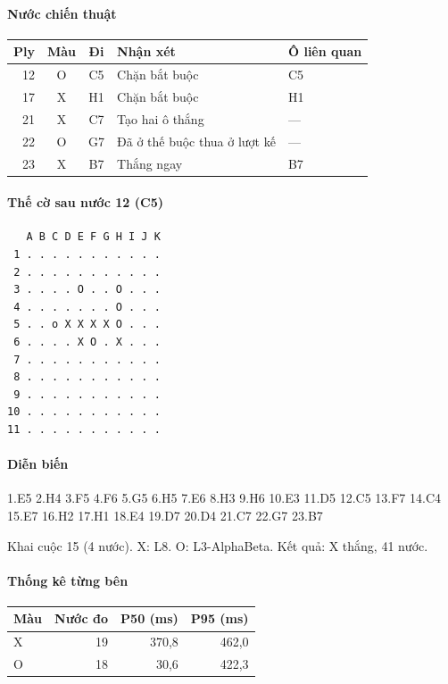 \paragraph{Nước chiến thuật}
\begin{center}\small
\begin{tabular}{@{}rccll@{}}
\toprule
Ply & Màu & Đi & Nhận xét & Ô liên quan \\
\midrule
12 & O & C5 & Chặn bắt buộc & C5 \\
17 & X & H1 & Chặn bắt buộc & H1 \\
21 & X & C7 & Tạo hai ô thắng & — \\
22 & O & G7 & Đã ở thế buộc thua ở lượt kế & — \\
23 & X & B7 & Thắng ngay & B7 \\
\bottomrule
\end{tabular}
\end{center}
\paragraph{Thế cờ sau nước 12 (C5)}
\begin{verbatim}
   A B C D E F G H I J K
 1 . . . . . . . . . . .
 2 . . . . . . . . . . .
 3 . . . . O . . O . . .
 4 . . . . . . . O . . .
 5 . . o X X X X O . . .
 6 . . . . X O . X . . .
 7 . . . . . . . . . . .
 8 . . . . . . . . . . .
 9 . . . . . . . . . . .
10 . . . . . . . . . . .
11 . . . . . . . . . . .
\end{verbatim}
\paragraph{Diễn biến}
{\footnotesize 1.E5 2.H4 3.F5 4.F6 5.G5 6.H5 7.E6 8.H3 9.H6 10.E3 11.D5 12.C5 13.F7 14.C4 15.E7 16.H2 17.H1 18.E4 19.D7 20.D4 21.C7 22.G7 23.B7\par}
Khai cuộc 15 (4 nước). X: L8. O: L3-AlphaBeta. Kết quả: X thắng, 41 nước.
\paragraph{Thống kê từng bên}
\begin{center}\small
\begin{tabular}{@{}lrrr@{}}
\toprule
Màu & Nước đo & P50 (ms) & P95 (ms) \\
\midrule
X & 19 & 370,8 & 462,0 \\
O & 18 & 30,6 & 422,3 \\
\bottomrule
\end{tabular}
\end{center}
